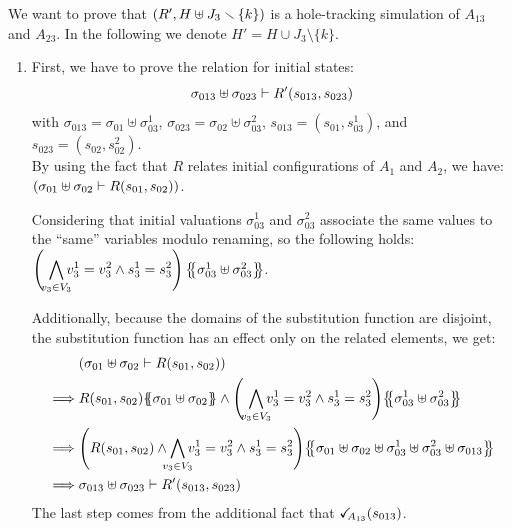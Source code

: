 \documentclass[runningheads]{llncs}
\begin{document}
We want to prove that ${\left(R', H\uplus J_3 \smallsetminus\{k\}\right)}$ is a hole-tracking simulation of $A_{13}$ and $A_{23}$. In the following we denote $H'=H\cup J_3 \setminus\{k\}$.
\begin{enumerate}
\item First, we have to prove the relation for initial states:
\[\sigma_{013} \uplus \sigma_{023} \vdash R'{\left(s_{013}, s_{023}\right)}\]
with $\sigma_{013} = \sigma_{01} \uplus \sigma_{03}^1$, $\sigma_{023} = \sigma_{02} \uplus \sigma_{03}^2$, $s_{013}=(s_{01},s_{03}^1)$, and $s_{023}=(s_{02},s_{02}^2)$.\\
By using the fact that $R$ relates initial configurations of  $A_1$ and $A_2$, we have:
${\left(\sigma_{01} \uplus \sigma_{02} \vdash R{\left(s_{01}, s_{02}\right)}\right)}$.  

Considering that initial valuations $\sigma_{03}^1$ and $\sigma_{03}^2$ associate the same values to the ``same'' variables modulo renaming, so the following holds:\\ $\left(\,\,{\displaystyle \bigwedge_\subbox{v_3\in V_3} v^1_3=v^2_3\wedge s^1_3 = s^2_3}\right)\psubst{\sigma_{03}^1 \uplus \sigma_{03}^2 }$.

Additionally, because  the domains of the substitution function are disjoint, the substitution function has an effect only on the related elements,  we get:
\begin{align*}
& \mpar{\sigma_{01} \uplus \sigma_{02} \vdash R\mpar{s_{01}, s_{02}}} 
\\
\implies & R\mpar{s_{01}, s_{02}}\psubst{ \sigma_{01} \uplus \sigma_{02}}  \land \mpar{\,\,\bigwedge_\subbox{v_3\in V_3} v^1_3=v^2_3\wedge s^1_3 = s^2_3}\psubst{\sigma_{03}^1 \uplus \sigma_{03}^2 }\\
\implies & \mpar{R\mpar{s_{01}, s_{02}} \wedge  \bigwedge_\subbox{v_3\in V_3}  v^1_3=v^2_3\wedge s^1_3 = s^2_3} \psubst{ \sigma_{01} \uplus \sigma_{02} \uplus \sigma^1_{03}\uplus \sigma^2_{03}\uplus \sigma_{013} }\\
\implies & \sigma_{013} \uplus \sigma_{023} \vdash R'\mpar{s_{013}, s_{023}}
\end{align*}
The last step comes from the additional fact that  $\checkmark_{\!\! A_{13}}(s_{013})$.


\end{enumerate}
\end{document}
